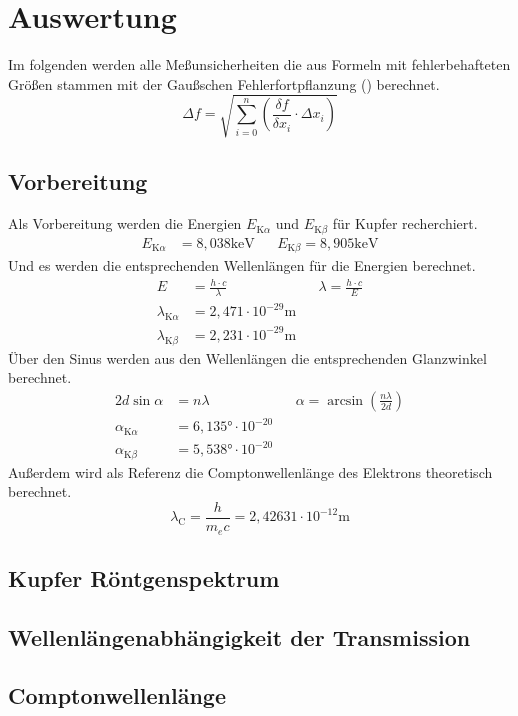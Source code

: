 \section{Auswertung}
\label{sec:Auswertung}

Im folgenden werden alle Meßunsicherheiten die aus Formeln mit fehlerbehafteten Größen stammen
mit der Gaußschen Fehlerfortpflanzung () berechnet.
\begin{equation}
    \Delta f =  \sqrt{\sum_{i=0}^n \left( \frac{\delta f}{\delta x_i} \cdot \Delta x_i\right)}   
    \label{eqn:Gauss}
\end{equation}
\subsection{Vorbereitung}
Als Vorbereitung werden die Energien $E_{\text{K}\alpha}$ und $E_{\text{K}\beta}$ für Kupfer recherchiert.
\begin{align}
    E_{\text{K}\alpha} &= 8,038\text{keV}    &&   E_{\text{K}\beta} = 8,905\text{keV} \label{eqn:EnergieKupfer}
\end{align}
Und es werden die entsprechenden Wellenlängen für die Energien berechnet.
\begin{align}
    E &= \frac{h\cdot c}{\lambda} && \lambda = \frac{h\cdot c}{E} \nonumber \\
    \lambda_{\text{K}\alpha} &= 2,471\cdot 10^{-29} \text{m} \\
    \lambda_{\text{K}\beta} &= 2,231 \cdot 10^{-29} \text{m} 
\end{align}
Über den Sinus werden aus den Wellenlängen die entsprechenden Glanzwinkel berechnet.
\begin{align}
   2d\sin{\alpha} &= n\lambda && \alpha = \arcsin \left(\frac{n\lambda}{2d}\right) \nonumber \\
   \alpha_{\text{K}\alpha} &= 6,135° \cdot 10^{-20} \\
   \alpha_{\text{K}\beta} &= 5,538° \cdot 10^{-20}
\end{align}
Außerdem wird als Referenz die Comptonwellenlänge des Elektrons theoretisch berechnet.
\begin{equation}
    \lambda_{\text{C}} = \frac{h}{m_e c} = 2,42631 \cdot 10^{-12} \text{m}
\end{equation}
\subsection{Kupfer Röntgenspektrum}
\subsection{Wellenlängenabhängigkeit der Transmission}
\subsection{Comptonwellenlänge}